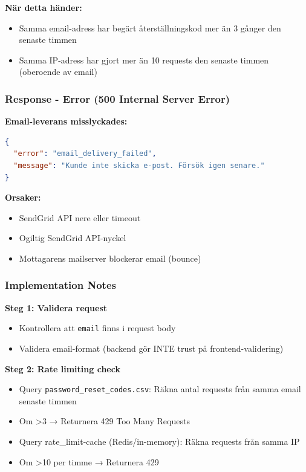 \documentclass[12pt,a4paper]{article}
\begin{document}
\textbf{När detta händer:}
\begin{itemize}[noitemsep]
  \item Samma email-adress har begärt återställningskod mer än 3 gånger den senaste timmen
  \item Samma IP-adress har gjort mer än 10 requests den senaste timmen (oberoende av email)
\end{itemize}

\subsubsection{Response - Error (500 Internal Server Error)}
\textbf{Email-leverans misslyckades:}
\begin{lstlisting}[language=json]
{
  "error": "email_delivery_failed",
  "message": "Kunde inte skicka e-post. Försök igen senare."
}
\end{lstlisting}

\textbf{Orsaker:}
\begin{itemize}[noitemsep]
  \item SendGrid API nere eller timeout
  \item Ogiltig SendGrid API-nyckel
  \item Mottagarens mailserver blockerar email (bounce)
\end{itemize}

\subsubsection{Implementation Notes}

\textbf{Steg 1: Validera request}
\begin{itemize}[noitemsep]
  \item Kontrollera att \texttt{email} finns i request body
  \item Validera email-format (backend gör INTE trust på frontend-validering)
\end{itemize}

\textbf{Steg 2: Rate limiting check}
\begin{itemize}[noitemsep]
  \item Query \texttt{password\_reset\_codes.csv}: Räkna antal requests från samma email senaste timmen
  \item Om \textgreater 3 → Returnera 429 Too Many Requests
  \item Query rate\_limit-cache (Redis/in-memory): Räkna requests från samma IP
  \item Om \textgreater 10 per timme → Returnera 429
\end{itemize}
\end{document}

